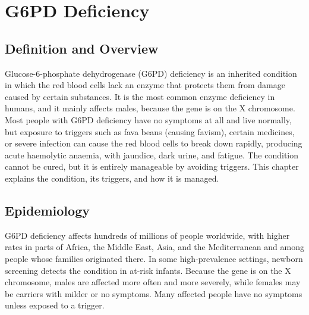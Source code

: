 \chapter{G6PD Deficiency}

\section*{Definition and Overview}
Glucose-6-phosphate dehydrogenase (G6PD) deficiency is an inherited condition in which the red blood cells lack an enzyme that protects them from damage caused by certain substances. It is the most common enzyme deficiency in humans, and it mainly affects males, because the gene is on the X chromosome. Most people with G6PD deficiency have no symptoms at all and live normally, but exposure to triggers such as fava beans (causing favism), certain medicines, or severe infection can cause the red blood cells to break down rapidly, producing acute haemolytic anaemia, with jaundice, dark urine, and fatigue. The condition cannot be cured, but it is entirely manageable by avoiding triggers. This chapter explains the condition, its triggers, and how it is managed.

\section*{Epidemiology}
G6PD deficiency affects hundreds of millions of people worldwide, with higher rates in parts of Africa, the Middle East, Asia, and the Mediterranean and among people whose families originated there. In some high-prevalence settings, newborn screening detects the condition in at-risk infants. Because the gene is on the X chromosome, males are affected more often and more severely, while females may be carriers with milder or no symptoms. Many affected people have no symptoms unless exposed to a trigger.

